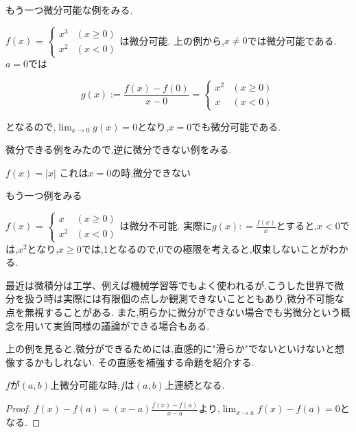 もう一つ微分可能な例をみる.

\begin{epl}
$f(x)$ = $
\begin{cases}
x^3 & (x \ge 0)\\
x^2 & (x < 0)
\end{cases}
$は微分可能.
上の例から,$x \neq 0$では微分可能である.
$a = 0$では

\begin{equation*}
g(x) := \frac{f(x) -f(0)}{x - 0} =
\begin{cases}
x^2 & (x \ge 0)\\
x & (x < 0)
\end{cases}
\end{equation*}

となるので,$\displaystyle \lim_{x \to 0} g(x) = 0$となり,$x = 0$でも微分可能である.
\end{epl}


微分できる例をみたので,逆に微分できない例をみる.


\begin{epl}
$f(x) = |x|$
これは$x=0$の時,微分できない
\end{epl}


もう一つ例をみる


\begin{epl}
$f(x)$ = $
\begin{cases}
x & (x \ge 0)\\
x^2 & (x < 0)
\end{cases}
$は微分不可能.
実際に$g(x): = \frac{f(x)}{x}$とすると,$x < 0$では,$x^2$となり,$x \ge 0$では,1となるので,$0$での極限を考えると,収束しないことがわかる.
\end{epl}


\begin{rem}
最近は微積分は工学、例えば機械学習等でもよく使われるが,こうした世界で微分を扱う時は実際には有限個の点しか観測できないことともあり,微分不可能な点を無視することがある.
また,明らかに微分ができない場合でも劣微分という概念を用いて実質同様の議論ができる場合もある.
\end{rem}


上の例を見ると,微分ができるためには,直感的に"滑らか"でないといけないと想像するかもしれない.
その直感を補強する命題を紹介する.


\begin{prop}
$f$が$(a,b)$上微分可能な時,$f$は$(a,b)$上連続となる.
\end{prop}


\begin{proof}
$f(x) - f(a) = (x-a) \frac{f(x) - f(a)}{x -a}$より,$\lim_{x \to a}f(x) - f(a) = 0$となる.
\end{proof}

